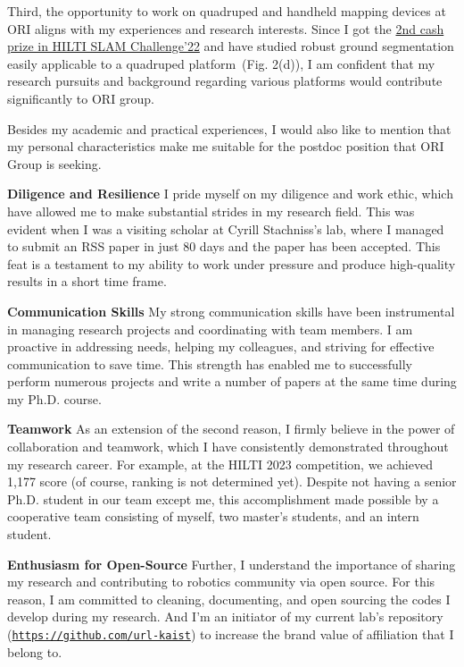 \documentclass[11pt, a4paper]{../awesome-cv}
\begin{document}
\begin{cvletter}
Third, the opportunity to work on quadruped and handheld mapping devices at ORI aligns with my experiences and research interests.
Since I got the \href{https://hilti-challenge.com/leader-board-2022.html}{2nd cash prize in HILTI SLAM Challenge'22} and have studied robust ground segmentation easily applicable to a quadruped platform~(Fig. 2(d)),
I am confident that my research pursuits and background regarding various platforms would contribute significantly to ORI group.




Besides my academic and practical experiences, I would also like to mention that my personal characteristics make me suitable for the postdoc position that ORI Group is seeking.

\textbf{Diligence and Resilience} I pride myself on my diligence and work ethic, which have allowed me to make substantial strides in my research field.
This was evident when I was a visiting scholar at Cyrill Stachniss's lab, where I managed to submit an RSS paper in just 80 days and the paper has been accepted.
This feat is a testament to my ability to work under pressure and produce high-quality results in a short time frame.

\textbf{Communication Skills} My strong communication skills have been instrumental in managing research projects and coordinating with team members.
I am proactive in addressing needs, helping my colleagues, and striving for effective communication to save time.
This strength has enabled me to successfully perform numerous projects and write a number of papers at the same time during my Ph.D. course.

\textbf{Teamwork} As an extension of the second reason, I firmly believe in the power of collaboration and teamwork, which I have consistently demonstrated throughout my research career.
For example, at the HILTI 2023 competition, we achieved 1,177 score (of course, ranking is not determined yet).
Despite not having a senior Ph.D. student in our team except me, this accomplishment made possible by a cooperative team consisting of myself, two master's students, and an intern student.

\textbf{Enthusiasm for Open-Source} Further, I understand the importance of sharing my research and contributing to robotics community via open source.
For this reason, I am committed to cleaning, documenting, and open sourcing the codes I develop during my research.
And I'm an initiator of my current lab's repository (\href{https://github.com/url-kaist}{\texttt{https://github.com/url-kaist}}) to increase the brand value of affiliation that I belong to.


\end{cvletter}
\end{document}
